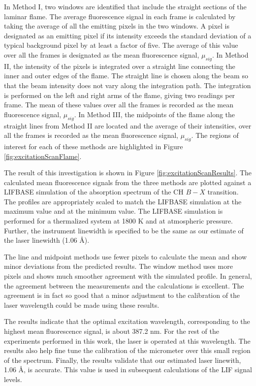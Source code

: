 In Method I, two windows are identified that include the straight sections of the laminar flame.
The average fluorescence signal in each frame is calculated by taking the average of all the emitting pixels in the two windows.
A pixel is designated as an emitting pixel if its intensity exceeds the standard deviation of a typical background pixel by at least a factor of five.
The average of this value over all the frames is designated as the mean fluorescence signal, \(\mu_{sig}\).
In Method II, the intensity of the pixels is integrated over a straight line connecting the inner and outer edges of the flame.
The straight line is chosen along the beam so that the beam intensity does not vary along the integration path.
The integration is performed on the left and right arms of the flame, giving two readings per frame.
The mean of these values over all the frames is recorded as the mean fluorescence signal, \(\mu_{sig}\).
In Method III, the midpoints of the flame along the straight lines from Method II are located and the average of their intensities, over all the frames is recorded as the mean fluorescence signal, \(\mu_{sig}\).
The regions of interest for each of these methods are highlighted in Figure \ref{fig:excitationScanFlame}.

The result of this investigation is shown in Figure \ref{fig:excitationScanResults}.
The calculated mean fluorescence signals from the three methods are plotted against a LIFBASE simulation of the absorption spectrum of the CH \(B-X\) transition.
The profiles are appropriately scaled to match the LIFBASE simulation at the maximum value and at the minimum value.
The LIFBASE simulation is performed for a thermalized system at 1800 K and at atmospheric pressure.
Further, the instrument linewidth is specified to be the same as our estimate of the laser linewidth (1.06 \AA).



The line and midpoint methods use fewer pixels to calculate the mean and show minor deviations from the predicted results.
The window method uses more pixels and shows much smoother agreement with the simulated profile.
In general, the agreement between the measurements and the calculations is excellent.
The agreement is in fact so good that a minor adjustment to the calibration of the laser wavelength could be made using these results.

The results indicate that the optimal excitation wavelength, corresponding to the highest mean fluorescence signal, is about 387.2 nm.
For the rest of the experiments performed in this work, the laser is operated at this wavelength.
The results also help fine tune the calibration of the micrometer over this small region of the spectrum.
Finally, the results validate that our estimated laser linewith, 1.06 \AA, is accurate.
This value is used in subsequent calculations of the LIF signal levels.


